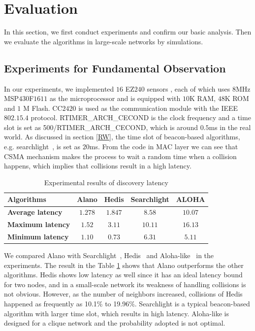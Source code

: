 \section{Evaluation}
\label{Evaluation}

In this section, we first conduct experiments and confirm our basic analysis.
Then we evaluate the algorithms in large-scale networks by simulations.

\subsection{Experiments for Fundamental Observation}

In our experiments, we implemented $16$ EZ$240$ sensors \cite{huang2012easipled}, each of which uses $8$MHz MSP$430$F$1611$ 
as the microprocessor and is equipped with $10$K RAM, 
$48$K ROM and $1$ M Flash. CC$2420$ is used as the communication 
module with the IEEE $802.15.4$ protocol. RTIMER\_ARCH\_CECOND is the clock frequency 
and a time slot is set as 500/RTIMER\_ARCH\_CECOND,
which is around $0.5$ms in the real world. As discussed in section \ref{RW}, the time slot of beacon-based 
algorithms, e.g. searchlight~\cite{bakht2012searchlight}, is set as $20$ms.
From the code in MAC layer we can see  that CSMA mechanism makes the process to wait a random time 
when a collision happens, which implies that collisions result in a high latency.    

\begin{table}[htbp]
\caption{Experimental results of discovery latency}
\centering
\begin{tabular}{|l|c|c|c|c|} 
\hline
\textbf{Algorithms} & \textbf{Alano} & \textbf{Hedis} & \textbf{Searchlight} & \textbf{ALOHA} \\
\hline
\textbf{Average latency} & \textbf{$1.278$} & \textbf{$1.847$} & \textbf{$8.58$} & \textbf{$10.07$} \\
\hline
\textbf{Maximum latency} & \textbf{$1.52$} & \textbf{$3.11$} & \textbf{$10.11$} & \textbf{$16.13$} \\
\hline
\textbf{Minimum latency} & \textbf{$1.10$} & \textbf{$0.73$} & \textbf{$6.31$} & \textbf{$5.11$} \\
\hline
\end{tabular}
\label{Exp}
\end{table}

We compared Alano with Searchlight~\cite{bakht2012searchlight}, Hedis~\cite{chen2015heterogeneous}
and Aloha-like~\cite{you2011aloha} in the experiments. The result in the Table \ref{Exp} shows that Alano outperforms the other algorithms.
Hedis shows low latency as well since it has an ideal latency bound for two nodes, 
and in a small-scale network its weakness of handling collisions is not obvious. 
However, as the number of neighbors increased, collisions of Hedis \cite{chen2015heterogeneous} happened as frequently as 10.1\% to 19.96\%.
Searchlight is a typical beacon-based algorithm with larger time slot, which results in high latency.
Aloha-like is designed for a clique network and the probability adopted is not optimal.


